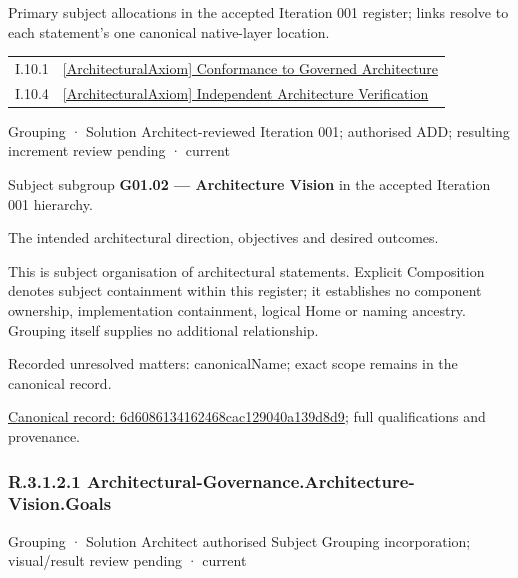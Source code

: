 Primary subject allocations in the accepted Iteration 001 register; links resolve to each statement’s one canonical native-layer location.\par
\begin{longtable}{p{.22\linewidth}p{.73\linewidth}}
I.10.1 & \hyperref[element:45eb197073df406ea4080f9665ca12ab]{[ArchitecturalAxiom] Conformance to Governed Architecture} \\
I.10.4 & \hyperref[element:82d29abf230d478aaf42ecb73ecbd01e]{[ArchitecturalAxiom] Independent Architecture Verification} \\
\end{longtable}
\label{element:6d6086134162468cac129040a139d8d9}
{\small Grouping · Solution Architect-reviewed Iteration 001; authorised ADD; resulting increment review pending · current}\par

Subject subgroup \textbf{G01.02 — Architecture Vision} in the accepted Iteration 001 hierarchy.



The intended architectural direction, objectives and desired outcomes.



This is subject organisation of architectural statements. Explicit Composition denotes subject containment within this register; it establishes no component ownership, implementation containment, logical Home or naming ancestry. Grouping itself supplies no additional relationship.


{\small Recorded unresolved matters: canonicalName; exact scope remains in the canonical record.}\par
{\footnotesize \href{../../../../continuum/grouping/6d6086134162468cac129040a139d8d9.md}{Canonical record: 6d6086134162468cac129040a139d8d9}; full qualifications and provenance.}\par
\subsubsection*{R.3.1.2.1 Architectural-Governance.Architecture-Vision.Goals}
\label{navigation:R.3.1.2.1}

\label{element:b01782f63be44bc9ab2f6ebbf84b37f2}
{\small Grouping · Solution Architect authorised Subject Grouping incorporation; visual/result review pending · current}\par

